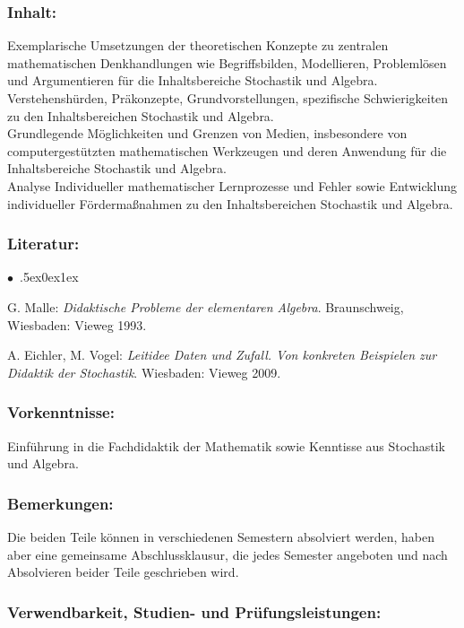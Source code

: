 \documentclass[a4paper,10pt]{article}
\renewenvironment{itemize}{\begin{list}{$\bullet$\ }{\itemsep.5ex\setlength{\topsep}{0.5\itemsep}\parsep0ex\labelsep1ex\settowidth{\labelwidth}{$\bullet$\ }\setlength{\leftmargin}{\labelwidth}\addtolength{\leftmargin}{3ex}\addtolength{\leftmargin}{\labelsep}}}{\end{list}}
\begin{document}
\subsubsection*{\large
    Inhalt:
}
Exemplarische Umsetzungen der theoretischen Konzepte zu zentralen mathematischen Denkhandlungen wie Begriffsbilden, Modellieren, Problemlösen und Argumentieren für die Inhaltsbereiche Stochastik und Algebra. \\
Verstehenshürden, Präkonzepte, Grundvorstellungen, spezifische Schwierigkeiten zu den Inhaltsbereichen Stochastik und Algebra.\\
Grundlegende Möglichkeiten und Grenzen von Medien, insbesondere von computergestützten mathematischen Werkzeugen und deren Anwendung für die Inhaltsbereiche Stochastik und Algebra. \\
Analyse Individueller mathematischer Lernprozesse und Fehler sowie Entwicklung individueller Fördermaßnahmen zu den Inhaltsbereichen Stochastik und Algebra.
\subsubsection*{\large
    Literatur:
}
\begin{itemize}
\item 
G. Malle: \emph{Didaktische Probleme der elementaren Algebra}. Braunschweig, Wiesbaden: Vieweg 1993. 
\item
A. Eichler, M. Vogel: \emph{Leitidee Daten und Zufall. Von konkreten Beispielen zur Didaktik der Stochastik}. Wiesbaden:
Vieweg 2009.
\end{itemize}
\subsubsection*{\large
    Vorkenntnisse:
}
Einführung in die Fachdidaktik der Mathematik sowie Kenntisse aus Stochastik und Algebra.
\subsubsection*{\large
    Bemerkungen:
}
Die beiden Teile können in verschiedenen Semestern absolviert werden, haben aber eine gemeinsame Abschlussklausur, die jedes Semester angeboten und nach Absolvieren beider Teile geschrieben wird.
\cleardoublepage
\subsubsection*{\large
    Verwendbarkeit, Studien- und Prüfungsleistungen:
}
\end{document}

